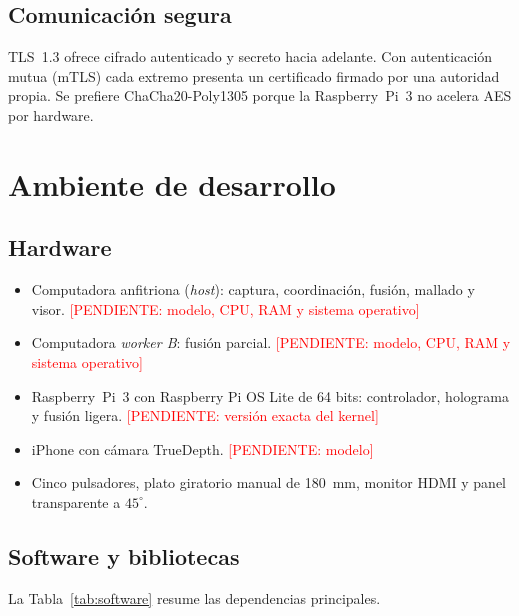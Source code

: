 \documentclass[journal]{IEEEtran}
\newcommand{\pendiente}[1]{\textcolor{red}{[PENDIENTE: #1]}}
\begin{document}
\subsection{Comunicación segura}
TLS~1.3 \cite{tls13} ofrece cifrado autenticado y secreto hacia adelante. Con
autenticación mutua (mTLS) cada extremo presenta un certificado firmado por una
autoridad propia. Se prefiere ChaCha20-Poly1305 \cite{chacha} porque la
Raspberry~Pi~3 no acelera AES por hardware.

\section{Ambiente de desarrollo}

\subsection{Hardware}
\begin{itemize}
  \item Computadora anfitriona (\emph{host}): captura, coordinación, fusión,
        mallado y visor. \pendiente{modelo, CPU, RAM y sistema operativo}
  \item Computadora \emph{worker B}: fusión parcial.
        \pendiente{modelo, CPU, RAM y sistema operativo}
  \item Raspberry~Pi~3 con Raspberry Pi OS Lite de 64 bits: controlador,
        holograma y fusión ligera. \pendiente{versión exacta del kernel}
  \item iPhone con cámara TrueDepth. \pendiente{modelo}
  \item Cinco pulsadores, plato giratorio manual de 180~mm, monitor HDMI y panel
        transparente a $45^{\circ}$.
\end{itemize}

\subsection{Software y bibliotecas}
La Tabla~\ref{tab:software} resume las dependencias principales.
\end{document}
